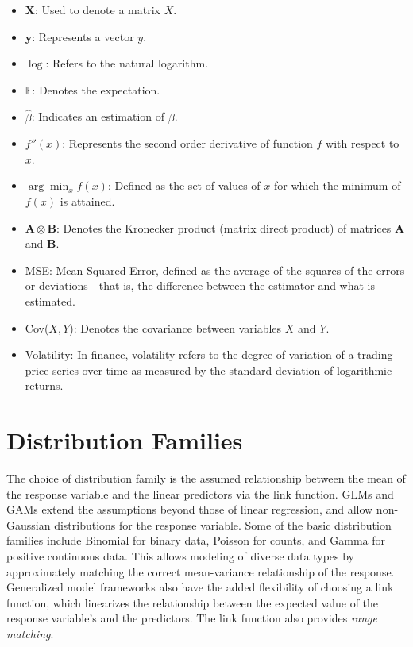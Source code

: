 \documentclass[12pt, twoside,hidelinks]{article}
\theoremstyle{definition}
\numberwithin{equation}{section}
\begin{document}
\begin{itemize}
    \item \(\mathbf{X}\): Used to denote a matrix \(X\).
    \item \(\boldsymbol{y}\): Represents a vector \(y\).
    \item \(\log\): Refers to the natural logarithm.
    \item \(\mathbb{E}\): Denotes the expectation.
    \item \(\hat{\beta}\): Indicates an estimation of \(\beta\).
    \item \(f''(x)\): Represents the second order derivative of function \(f\) with respect to \(x\).
    \item \(\arg\min_{x} f(x)\): Defined as the set of values of \(x\) for which the minimum of \(f(x)\) is attained.
    \item \(\mathbf{A} \otimes \mathbf{B}\): Denotes the Kronecker product (matrix direct product) of matrices \(\mathbf{A}\) and \(\mathbf{B}\).
    \item MSE: Mean Squared Error, defined as the average of the squares of the errors or deviations—that is, the difference between the estimator and what is estimated.
    \item Cov(\(X, Y\)): Denotes the covariance between variables \(X\) and \(Y\).
    \item Volatility: In finance, volatility refers to the degree of variation of a trading price series over time as measured by the standard deviation of logarithmic returns.
\end{itemize}

\section{Distribution Families}

The choice of distribution family is the assumed relationship between the mean of the response variable and the linear predictors via the link function. GLMs and GAMs extend the assumptions beyond those of linear regression, and allow non-Gaussian distributions for the response variable. Some of the basic distribution families include Binomial for binary data, Poisson for counts, and Gamma for positive continuous data. This allows modeling of diverse data types by approximately matching the correct mean-variance relationship of the response. Generalized model frameworks also have the added flexibility of choosing a link function, which linearizes the relationship between the expected value of the response variable's and the predictors. The link function also provides \textit{range matching}. 
\end{document}
